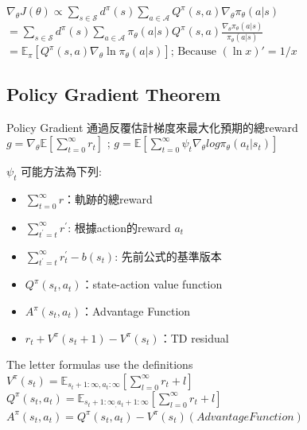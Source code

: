 \documentclass[14pt,a4paper]{report}  %
\begin{document}
$\nabla_\theta J(\theta)
\propto \sum_{s \in \mathcal{S}} d^\pi(s) \sum_{a \in \mathcal{A}} Q^\pi(s, a) \nabla_\theta \pi_\theta(a \vert s) $\\[5pt]
$= \sum_{s \in \mathcal{S}} d^\pi(s) \sum_{a \in \mathcal{A}} \pi_\theta(a \vert s) Q^\pi(s, a) \frac{\nabla_\theta \pi_\theta(a \vert s)}{\pi_\theta(a \vert s)} $\\[5pt]
$= \mathbb{E}_\pi [Q^\pi(s, a) \nabla_\theta \ln \pi_\theta(a \vert s)]  \scriptstyle{\text{; Because } (\ln x)' = 1/x}$
\\[5pt]
\subsection{Policy Gradient Theorem}
Policy Gradient 通過反覆估計梯度來最大化預期的總reward\\[5pt]
$g = \nabla_\theta\mathbb{E}[\sum_{t=0}^\infty r_t]$ ; $g = \mathbb{E}[\sum_{t=0}^\infty\psi_t\nabla_\theta log\pi_\theta(a_t \vert s_t)]$\\[5pt]
\begin{normalsize}{$\psi_t$ 可能方法為下列:}\end{normalsize}
\begin{itemize}
\item $\sum_{t=0}^\infty r$：軌跡的總reward
\item $\sum_{t^{'}=t}^\infty r^{'}$: 根據action的reward $a_t$
\item $\sum_{t^{'}=t}^\infty r_t^{'}-b(s_t)$: 先前公式的基準版本
\item $Q^\pi(s_t,a_t)$：state-action value function
\item $A^\pi(s_t,a_t)$：Advantage Function
\item $r_t+V^\pi(s_t+1)-V^\pi(s_t)$：TD residual
\end{itemize}
The letter formulas use the definitions\\[5pt]
$V^\pi(s_t) = \mathbb{E}_{s_{t}+1:\infty,a_{t}:\infty}[\sum_{l=0}^\infty r_t+l]$\\[5pt]
$Q^\pi(s_t,a_t) = \mathbb{E}_{s_{t}+1:\infty_,a_{t}+1:\infty}[\sum_{l=0}^\infty r_t+l]$\\[5pt]
$A^\pi(s_t,a_t) = Q^\pi(s_t,a_t)-V^\pi(s_t)(Advantage Function)$\\[5pt]
\end{document}
